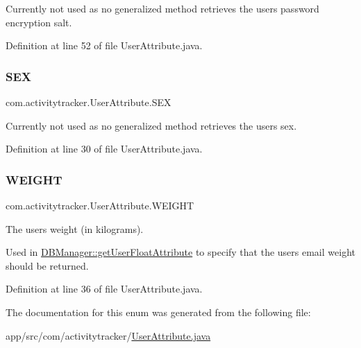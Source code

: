 Currently not used as no generalized method retrieves the user\textquotesingle{}s password encryption salt. 

Definition at line 52 of file User\+Attribute.\+java.

\mbox{\label{enumcom_1_1activitytracker_1_1_user_attribute_a53fe928fb805b69c606a351aac257558}} 
\subsubsection{\texorpdfstring{S\+EX}{SEX}}
{\footnotesize\ttfamily com.\+activitytracker.\+User\+Attribute.\+S\+EX}

Currently not used as no generalized method retrieves the user\textquotesingle{}s sex. 

Definition at line 30 of file User\+Attribute.\+java.

\mbox{\label{enumcom_1_1activitytracker_1_1_user_attribute_a024206b0dc3261031ef586b3f0fd530c}} 
\subsubsection{\texorpdfstring{W\+E\+I\+G\+HT}{WEIGHT}}
{\footnotesize\ttfamily com.\+activitytracker.\+User\+Attribute.\+W\+E\+I\+G\+HT}

The user\textquotesingle{}s weight (in kilograms).

Used in \mbox{\hyperlink{classcom_1_1activitytracker_1_1_d_b_manager_a98df66254bec4d74b29cfe468a9fc794}{D\+B\+Manager\+::get\+User\+Float\+Attribute}} to specify that the user\textquotesingle{}s email weight should be returned. 

Definition at line 36 of file User\+Attribute.\+java.



The documentation for this enum was generated from the following file\+:\begin{DoxyCompactItemize}
\item 
app/src/com/activitytracker/\mbox{\hyperlink{_user_attribute_8java}{User\+Attribute.\+java}}\end{DoxyCompactItemize}
